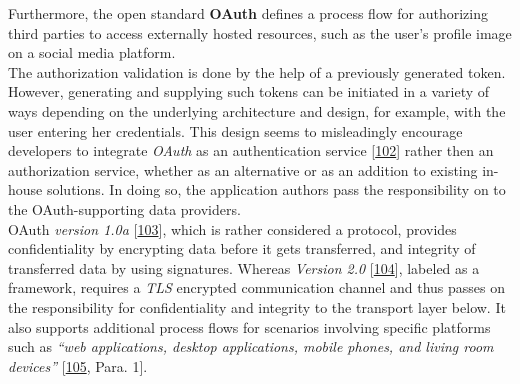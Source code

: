\documentclass[12pt,english,a4paper,titlepage,cleardoublepage=empty,dottedtoc]{report}
\begin{document}
Furthermore, the open standard
\textbf{\protect\hypertarget{def--oauth}{}{OAuth}} defines a process
flow for authorizing third parties to access externally hosted
resources, such as the user's profile image on a social media
platform.\\
The authorization validation is done by the help of a previously
generated token. However, generating and supplying such tokens can be
initiated in a variety of ways depending on the underlying architecture
and design, for example, with the user entering her credentials. This
design seems to misleadingly encourage developers to integrate
\emph{OAuth} as an authentication service
{[}\protect\hyperlink{ref-web_2012_problem-with-oauth-for-authentication}{102}{]}
rather then an authorization service, whether as an alternative or as an
addition to existing in-house solutions. In doing so, the application
authors pass the responsibility on to the OAuth-supporting data
providers.\\
OAuth \emph{version 1.0a}
{[}\protect\hyperlink{ref-web_spec_oauth-1a}{103}{]}, which is rather
considered a protocol, provides confidentiality by encrypting data
before it gets transferred, and integrity of transferred data by using
signatures. Whereas \emph{Version 2.0}
{[}\protect\hyperlink{ref-web_spec_oauth-2}{104}{]}, labeled as a
framework, requires a \emph{TLS} encrypted communication channel and
thus passes on the responsibility for confidentiality and integrity to
the transport layer below. It also supports additional process flows for
scenarios involving specific platforms such as \emph{``web applications,
desktop applications, mobile phones, and living room devices''}
{[}\protect\hyperlink{ref-web_2016_oauth-2}{105}, Para. 1{]}.
\end{document}
